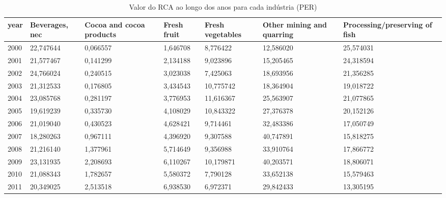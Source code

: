 \begin{table}
\centering
\caption{Valor do RCA ao longo dos anos para cada indústria (PER)}
\begin{tabular}{p{1cm}p{2cm}p{2cm}p{2cm}p{2cm}p{2cm}p{2cm}}
\toprule
 year &  Beverages, nec &  Cocoa and cocoa products &  Fresh fruit &  Fresh vegetables &  Other mining and quarring &  Processing/preserving of fish \\
\midrule
 2000 &       22,747644 &                  0,066557 &     1,646708 &          8,776422 &                  12,586020 &                      25,574031 \\
 2001 &       21,577467 &                  0,141299 &     2,134188 &          9,023896 &                  15,205465 &                      24,318594 \\
 2002 &       24,766024 &                  0,240515 &     3,023038 &          7,425063 &                  18,693956 &                      21,356285 \\
 2003 &       21,312533 &                  0,176805 &     3,434543 &         10,775742 &                  18,364904 &                      19,018722 \\
 2004 &       23,085768 &                  0,281197 &     3,776953 &         11,616367 &                  25,563907 &                      21,077865 \\
 2005 &       19,619239 &                  0,335730 &     4,108029 &         10,843322 &                  27,376378 &                      20,152126 \\
 2006 &       21,019040 &                  0,430523 &     4,628421 &          9,714461 &                  32,483386 &                      17,050749 \\
 2007 &       18,280263 &                  0,967111 &     4,396920 &          9,307588 &                  40,747891 &                      15,818275 \\
 2008 &       21,216140 &                  1,377961 &     5,714649 &          9,356988 &                  33,910764 &                      17,866772 \\
 2009 &       23,131935 &                  2,208693 &     6,110267 &         10,179871 &                  40,203571 &                      18,806071 \\
 2010 &       21,088343 &                  1,782657 &     5,580372 &          7,790128 &                  33,652138 &                      15,579463 \\
 2011 &       20,349025 &                  2,513518 &     6,938530 &          6,972371 &                  29,842433 &                      13,305195 \\

\end{tabular}
\end{table}
